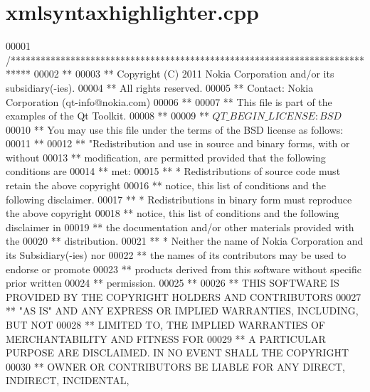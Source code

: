 \hypertarget{xmlsyntaxhighlighter_8cpp_source}{\section{xmlsyntaxhighlighter.\-cpp}
}

\begin{DoxyCode}
00001 \textcolor{comment}{/****************************************************************************}
00002 \textcolor{comment}{**}
00003 \textcolor{comment}{** Copyright (C) 2011 Nokia Corporation and/or its subsidiary(-ies).}
00004 \textcolor{comment}{** All rights reserved.}
00005 \textcolor{comment}{** Contact: Nokia Corporation (qt-info@nokia.com)}
00006 \textcolor{comment}{**}
00007 \textcolor{comment}{** This file is part of the examples of the Qt Toolkit.}
00008 \textcolor{comment}{**}
00009 \textcolor{comment}{** $QT\_BEGIN\_LICENSE:BSD$}
00010 \textcolor{comment}{** You may use this file under the terms of the BSD license as follows:}
00011 \textcolor{comment}{**}
00012 \textcolor{comment}{** "Redistribution and use in source and binary forms, with or without}
00013 \textcolor{comment}{** modification, are permitted provided that the following conditions are}
00014 \textcolor{comment}{** met:}
00015 \textcolor{comment}{**   * Redistributions of source code must retain the above copyright}
00016 \textcolor{comment}{**     notice, this list of conditions and the following disclaimer.}
00017 \textcolor{comment}{**   * Redistributions in binary form must reproduce the above copyright}
00018 \textcolor{comment}{**     notice, this list of conditions and the following disclaimer in}
00019 \textcolor{comment}{**     the documentation and/or other materials provided with the}
00020 \textcolor{comment}{**     distribution.}
00021 \textcolor{comment}{**   * Neither the name of Nokia Corporation and its Subsidiary(-ies) nor}
00022 \textcolor{comment}{**     the names of its contributors may be used to endorse or promote}
00023 \textcolor{comment}{**     products derived from this software without specific prior written}
00024 \textcolor{comment}{**     permission.}
00025 \textcolor{comment}{**}
00026 \textcolor{comment}{** THIS SOFTWARE IS PROVIDED BY THE COPYRIGHT HOLDERS AND CONTRIBUTORS}
00027 \textcolor{comment}{** "AS IS" AND ANY EXPRESS OR IMPLIED WARRANTIES, INCLUDING, BUT NOT}
00028 \textcolor{comment}{** LIMITED TO, THE IMPLIED WARRANTIES OF MERCHANTABILITY AND FITNESS FOR}
00029 \textcolor{comment}{** A PARTICULAR PURPOSE ARE DISCLAIMED. IN NO EVENT SHALL THE COPYRIGHT}
00030 \textcolor{comment}{** OWNER OR CONTRIBUTORS BE LIABLE FOR ANY DIRECT, INDIRECT, INCIDENTAL,}

\end{DoxyCode}
